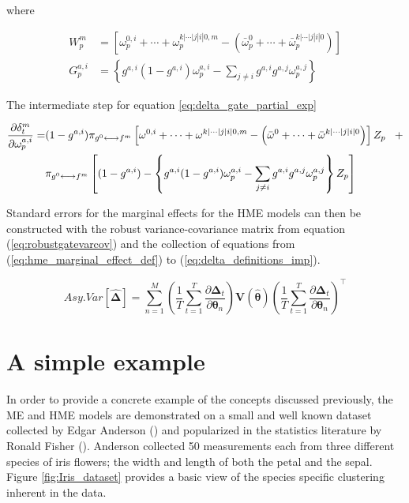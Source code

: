 \documentclass[12pt]{article}
\newcommand{\mean}[1]{\bar{#1}}
\newcommand{\gateprod}[2]{\pi_{#1 \longleftrightarrow #2}}
\begin{document}
where

\begin{align}
    W^{m}_{p}     &= \left[ \omega^{0, i}_{p} + \cdots + \omega^{k|\cdots|j|i|0, m}_{p} - \left( \mean{\omega}^{0}_{p} + \cdots + \mean{\omega}^{k|\cdots|j|i|0}_{p} \right) \right] \\
    G^{a,i}_{p} &= \left\{ g^{a,i} (1 - g^{a,i}) \omega^{a,i}_{p} - \sum_{j \neq i} g^{a,i} g^{a,j} \omega^{a,j}_{p} \right\}
\end{align}

The intermediate step for equation \ref{eq:delta_gate_partial_exp}

\begin{equation}
  \begin{split} \notag
    \frac{\partial \delta^{m}_{t}}{\partial \omega^{a,i}_{p}} =& (1 - g^{a,i})  \gateprod{g^{0}}{f^{m}}  \left[ \omega^{0, i} + \cdots + \omega^{k|\cdots|j|i|0, m} - \left( \mean{\omega}^{0} + \cdots + \mean{\omega}^{k|\cdots|j|i|0} \right) \right] Z_{p} \,\,\,\,\, + \\ 
    &\gateprod{g^{0}}{f^{m}} \left[ (1 - g^{a,i})  - \left\{ g^{a,i} (1 - g^{a,i}) \omega^{a,i}_{p} - \sum_{j \neq i} g^{a,i} g^{a,j} \omega^{a,j}_{p} \right\}  Z_{p}  \right]
  \end{split} 
\end{equation}

Standard errors for the marginal effects for the HME models can then be
constructed with the robust variance-covariance matrix from equation
(\ref{eq:robustgatevarcov}) and the collection of equations from
(\ref{eq:hme_marginal_effect_def}) to (\ref{eq:delta_definitions_imp}).


\begin{equation}
  Asy.Var \left[ \boldsymbol{ \hat{ \Delta } } \right] = \sum^{M}_{n=1}  \left( \frac{1}{T} \sum^{T}_{t=1} \frac{\partial \boldsymbol{\Delta}_{t}}{\partial \boldsymbol{\theta}_{n}} \right)     \boldsymbol{V}(\boldsymbol{\hat{\theta}})      \left( \frac{1}{T} \sum^{T}_{t=1} \frac{\partial \boldsymbol{\Delta}_{t}}{\partial \boldsymbol{\theta}_{n}} \right)^\top
\end{equation}





\section{A simple example} \label{sec:SimpleExample}

In order to provide a concrete example of the concepts discussed previously,
the ME and HME models are demonstrated on a small and well known dataset
collected by Edgar Anderson (\cite{Anderson1936}) and popularized in the
statistics literature by Ronald Fisher (\cite{Fisher1936}). Anderson collected
50 measurements each from three different species of iris flowers; the width and
length of both the petal and the sepal. Figure \ref{fig:Iris_dataset} provides a
basic view of the species specific clustering inherent in the data.
\end{document}
